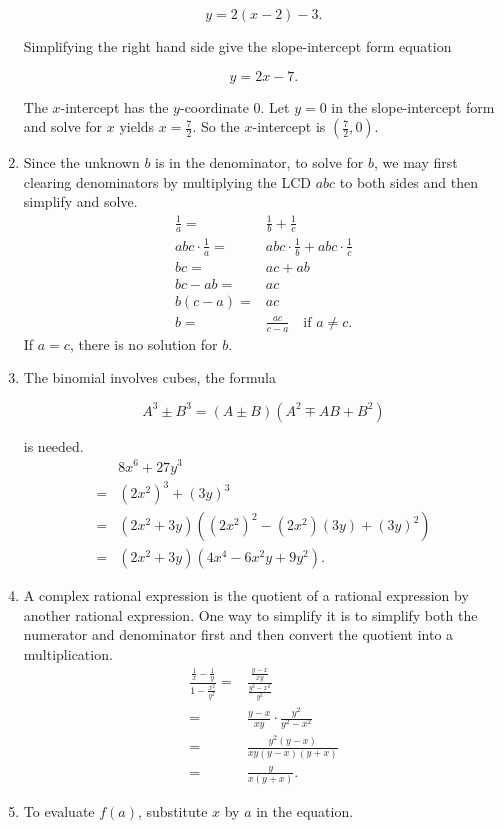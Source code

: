 \documentclass[
  12pt]{article}
\begin{document}
\begin{enumerate}
  \[y=2(x-2)-3.\]

  Simplifying the right hand side give the slope-intercept form equation

  \[y=2x-7.\]

  The \(x\)-intercept has the \(y\)-coordinate \(0\). Let \(y=0\) in the
  slope-intercept form and solve for \(x\) yields \(x=\frac72\). So the
  \(x\)-intercept is \(\left(\frac{7}{2},0\right)\).
\item
  Since the unknown \(b\) is in the denominator, to solve for \(b\), we
  may first clearing denominators by multiplying the LCD \(abc\) to both
  sides and then simplify and solve. \[
  \begin{aligned}
  \frac1a=&\frac1b+\frac1c\\
  abc\cdot\frac1a=&abc\cdot\frac1b+abc\cdot\frac1c\\
  bc=&ac+ab\\
  bc-ab=&ac\\
  b(c-a)=&ac\\
  b=&\frac{ac}{c-a}\quad\text{if }a\ne c.
  \end{aligned}
  \] If \(a=c\), there is no solution for \(b\).
\item
  The binomial involves cubes, the formula

  \[A^3\pm B^3=(A\pm B)(A^2\mp AB+B^2)\]

  is needed. \[
  \begin{aligned}
  &8x^6+27y^3\\
  =&(2x^2)^3+(3y)^3\\
  =&(2x^2 + 3y)((2x^2)^2-(2x^2)(3y)+(3y)^2)\\
  =&(2x^2 + 3y)(4x^4-6x^2y+9y^2).
  \end{aligned}
  \]
\item
  A complex rational expression is the quotient of a rational expression
  by another rational expression. One way to simplify it is to simplify
  both the numerator and denominator first and then convert the quotient
  into a multiplication. \[
  \begin{aligned}
  \frac{\frac1x-\frac1y}{1-\frac{x^2}{y^2}}
  =&\frac{\frac{y-x}{xy}}{\frac{y^2-x^2}{y^2}}\\
  =&\frac{y-x}{xy}\cdot\frac{y^2}{y^2-x^2}\\
  =&\frac{y^2(y-x)}{xy(y-x)(y+x)}\\
  =&\frac{y}{x(y+x)}.
  \end{aligned}
  \]
\item
  To evaluate \(f(a)\), substitute \(x\) by \(a\) in the equation.


\end{enumerate}
\end{document}
